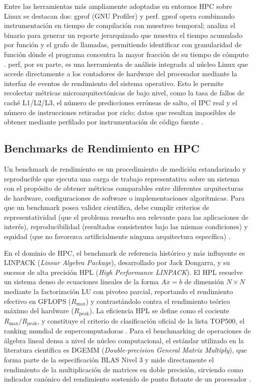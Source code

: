 Entre las herramientas más ampliamente adoptadas en entornos HPC sobre Linux se destacan
dos: gprof (GNU Profiler) y perf. gprof opera combinando instrumentación en tiempo de
compilación con muestreo temporal; analiza el binario para generar un reporte jerarquizado que
muestra el tiempo acumulado por función y el grafo de llamadas, permitiendo identificar con
granularidad de función dónde el programa concentra la mayor fracción de su tiempo de
cómputo \parencite{GrahamEtAl1982Gprof}. perf, por su parte, es una herramienta de análisis
integrada al núcleo Linux que accede directamente a los contadores de hardware del procesador
mediante la interfaz de eventos de rendimiento del sistema operativo. Esto le permite recolectar
métricas microarquitectónicas de bajo nivel, como la tasa de fallos de caché L1/L2/L3, el
número de predicciones erróneas de salto, el IPC real y el número de instrucciones retiradas
por ciclo; datos que resultan imposibles de obtener mediante perfilado por instrumentación de
código fuente \parencite{Patterson2017Computer}.


\subsection{Benchmarks de Rendimiento en HPC}
Un benchmark de rendimiento es un procedimiento de medición estandarizado y reproducible que
ejecuta una carga de trabajo representativa sobre un sistema con el propósito de obtener
métricas comparables entre diferentes arquitecturas de hardware, configuraciones de software
o implementaciones algorítmicas. Para que un benchmark posea validez científica, debe cumplir
criterios de representatividad (que el problema resuelto sea relevante para las aplicaciones de
interés), reproducibilidad (resultados consistentes bajo las mismas condiciones) y equidad (que
no favorezca artificialmente ninguna arquitectura específica) \parencite{Dongarra1990BLAS}.

En el dominio de HPC, el benchmark de referencia histórico y más influyente es LINPACK
(\textit{Linear Algebra Package}), desarrollado por Jack Dongarra, y su sucesor de alta precisión
HPL (\textit{High Performance LINPACK}). El HPL resuelve un sistema denso de ecuaciones
lineales de la forma \(Ax = b\) de dimensión \(N \times N\) mediante la factorización LU con
pivoteo parcial, reportando el rendimiento efectivo en GFLOPS (\(R_{\max}\)) y
contrastándolo contra el rendimiento teórico máximo del hardware (\(R_{\text{peak}}\)). La
eficiencia HPL se define como el cociente \(R_{\max} / R_{\text{peak}}\), y constituye el
criterio de clasificación oficial de la lista TOP500, el ranking mundial de supercomputadoras
\parencite{Dongarra1990BLAS}. Para el benchmarking de operaciones de álgebra lineal densa a
nivel de núcleo computacional, el estándar utilizado en la literatura científica es DGEMM
(\textit{Double-precision General Matrix Multiply}), que forma parte de la especificación BLAS
Nivel 3 y mide directamente el rendimiento de la multiplicación de matrices en doble precisión,
sirviendo como indicador canónico del rendimiento sostenido de punto flotante de un procesador
\parencite{Patterson2017Computer}.


